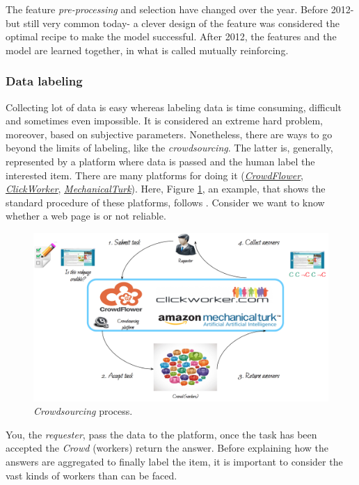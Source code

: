 The feature \emph{pre-processing} and selection have changed over the year. Before 2012- but still very common today- a clever design of the feature was considered the optimal recipe to make the model successful. After 2012, %
the features and the model are learned together, in what is called mutually reinforcing.

\subsubsection*{Data labeling}

Collecting lot of data is easy whereas labeling data is time consuming, difficult and sometimes even impossible. It is considered an extreme hard problem, moreover, based on subjective parameters. Nonetheless, there are ways to go beyond the limits of labeling, like the \emph{crowdsourcing}. The latter is, generally, represented by a platform where data is passed and the human label the interested item. There are many platforms for doing it (\href{https://en.wikipedia.org/wiki/CrowdFlower}{\emph{CrowdFlower}}, \href{https://www.clickworker.com}{\emph{ClickWorker}}, \href{https://en.wikipedia.org/wiki/Amazon_Mechanical_Turk}{\emph{MechanicalTurk}}).  Here, Figure \ref{pic:crowdsourcing}, an example, that shows the standard procedure of these platforms, follows . Consider we want to know whether a web page is or not reliable.  

\begin{figure}[H]%
 \centering
 \includegraphics[width=13cm]{./img/08/crowdsourcing}
 \caption{\label{pic:crowdsourcing} \emph{Crowdsourcing} process.}
\end{figure}

You, the \emph{requester}, pass the data to the platform, once the task has been accepted the \emph{Crowd} (workers) return the answer. Before explaining how the answers are aggregated to finally label the item, it is important to consider the vast kinds of workers than can be faced.

